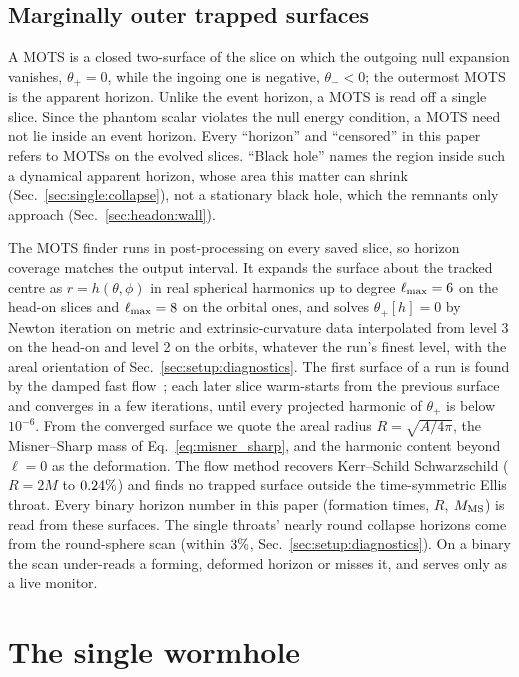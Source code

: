 \documentclass[twocolumn,floatfix,aps,prd,superscriptaddress,nofootinbib,showkeys]{revtex4-2}
\begin{document}
\subsection{Marginally outer trapped surfaces}
\label{sec:setup:mots}

A MOTS is a closed two-surface of the slice on which the outgoing null expansion vanishes, $\theta_+=0$, while
the ingoing one is negative, $\theta_-<0$; the outermost MOTS is the apparent horizon. Unlike the event
horizon, a MOTS is read off a single slice. Since the phantom scalar violates the null energy condition, a MOTS
need not lie inside an event horizon. Every ``horizon'' and ``censored'' in this paper refers to MOTSs on the
evolved slices. ``Black hole'' names the region inside such a dynamical apparent horizon, whose area this matter can shrink (Sec.~\ref{sec:single:collapse}), not a stationary black hole, which the remnants only approach (Sec.~\ref{sec:headon:wall}).

The MOTS finder runs in post-processing on every saved slice, so horizon coverage matches the output interval. It
expands the surface about the tracked centre as $r=h(\theta,\phi)$ in real spherical harmonics up to degree
$\ell_{\max}=6$ on the head-on slices and $\ell_{\max}=8$ on the orbital
ones, and solves $\theta_+[h]=0$ by Newton iteration on metric and extrinsic-curvature data interpolated from
level 3 on the head-on and level 2 on the orbits, whatever the run's finest level, with the areal orientation of
Sec.~\ref{sec:setup:diagnostics}. The first surface of a run is found by the damped fast
flow~\cite{gundlach1998}; each later slice warm-starts from the previous surface and converges in a few
iterations, until every projected harmonic of $\theta_+$ is below $10^{-6}$. From the converged surface
we quote the areal radius $R=\sqrt{A/4\pi}$, the Misner--Sharp mass of Eq.~\eqref{eq:misner_sharp}, and the
harmonic content beyond $\ell=0$ as the deformation. The flow method recovers Kerr--Schild Schwarzschild
($R=2M$ to $0.24\%$) and finds no trapped surface outside the time-symmetric Ellis throat. Every
binary horizon number in this paper (formation times, $R$, $M_{\rm MS}$) is read from these surfaces. The single
throats' nearly round collapse horizons come from the round-sphere scan (within $3\%$,
Sec.~\ref{sec:setup:diagnostics}). On a binary the scan under-reads a forming, deformed horizon or misses it, and
serves only as a live monitor.

\section{The single wormhole}
\label{sec:single}
\end{document}
